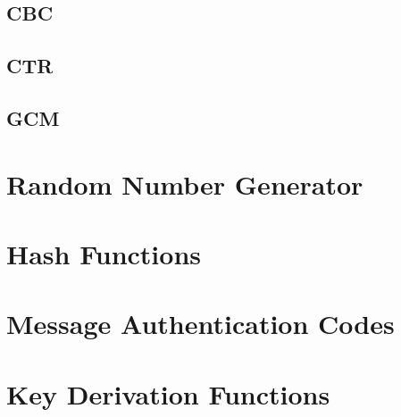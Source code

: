 \documentclass[11pt,a4paper]{report}
\theoremstyle{definitionstyle}
\begin{document}
\subsection{CBC}

\subsection{CTR}

\subsection{GCM}

\newpage
\section{Random Number Generator}

\section{Hash Functions}

\section{Message Authentication Codes}

\section{Key Derivation Functions}
\end{document}
